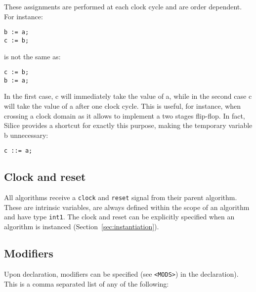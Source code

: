 \documentclass[a4]{article}
\newcommand\silice{Silice}
\begin{document}
\noindent These assignments are performed at each clock cycle and are order dependent. For instance:
\begin{verbatim}
b := a;
c := b;
\end{verbatim}
is not the same as:
\begin{verbatim}
c := b;
b := a;
\end{verbatim}
In the first case, c will immediately take the value of a, while in the second case
c will take the value of a after one clock cycle. This is useful, for instance, when
crossing a clock domain as it allows to implement a two stages flip-flop. In fact,
\silice{} provides a shortcut for exactly this purpose, making the temporary variable b unnecessary:

\begin{verbatim}
c ::= a;
\end{verbatim}


\subsection{Clock and reset}

All algorithms receive a \texttt{clock} and \texttt{reset} signal from their
parent algorithm. These are intrinsic variables, are always defined within
the scope of an algorithm and have type \texttt{int1}. The clock and reset
can be explicitly specified when an algorithm is instanced (Section~\ref{sec:instantiation}).


\subsection{Modifiers}

Upon declaration, modifiers can be specified (see \texttt{<MODS>}) in the declaration). This is a comma separated list of any of the following:
\end{document}
